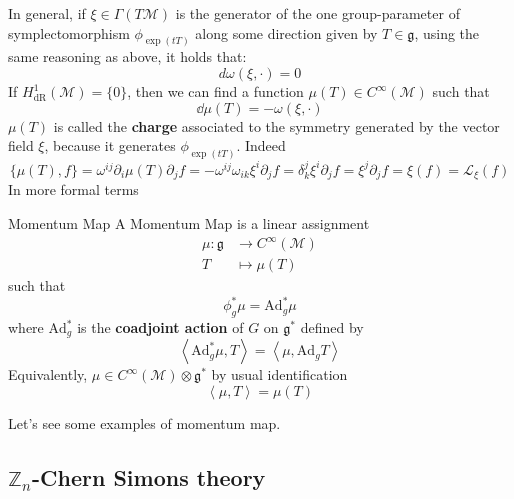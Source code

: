 \documentclass[11pt]{article}
\theoremstyle{definition}
\numberwithin{equation}{section}
\begin{document}
In general, if $\xi \in \Gamma(T \mathcal{M})$ is the generator of the one group-parameter of symplectomorphism $\phi_{\exp(t T)}$ along some direction given by $T \in \mathfrak{g}$, using the same reasoning as above, it holds that:
\begin{equation}
    d \omega(\xi, \cdot) =0
\end{equation}
If $H^1_{\text{dR}}(\mathcal{M})= \{0\}$, then we can find a function $\mu(T) \in C^{\infty}(\mathcal{M})$ such that
\begin{equation*}
    \dd \mu(T) = - \omega(\xi, \cdot)
\end{equation*}
$\mu(T)$ is called the \textbf{charge} associated to the symmetry generated by the vector field $\xi$, because it generates $\phi_{\exp(t T)}$. Indeed
\begin{equation}
    \{ \mu(T), f\} = \omega^{ij} \partial_i \mu(T)\partial_j f = - \omega^{ij} \omega_{ik} \xi^i \partial_j f = \delta^j_k \xi^i \partial_j f = \xi^j \partial_j f = \xi(f) = \mathcal{L}_{\xi}(f)
\end{equation}
In more formal terms
\begin{defn}{Momentum Map}{}
   A Momentum Map is a linear assignment
  \begin{equation}
  \begin{aligned}
  	 \mu:  \mathfrak{g} &\to C^{\infty}(\mathcal{M})\\
	T &\mapsto \mu(T)
    \end{aligned}
\end{equation}
such that
\begin{equation}
     \phi_g^* \mu = \text{Ad}^*_g \mu
\end{equation}
where $\text{Ad}^*_g$ is the \textbf{coadjoint action} of $G$ on $\mathfrak{g}^*$ defined by
\begin{equation}
    \left \langle \text{Ad}^*_g \mu , T \right \rangle = \left \langle \mu , \text{Ad}_g T \right \rangle
\end{equation}
Equivalently, $\mu \in  C^{\infty}(\mathcal{M}) \otimes \mathfrak{g}^*$ by usual identification
\begin{equation}
    \left \langle \mu, T \right \rangle = \mu(T)
\end{equation}
\end{defn} 
Let's see some examples of momentum map.

\subsection{\texorpdfstring{$\mathbb{Z}_n$-Chern Simons theory}{ZnCS}}\label{ZNCS}
\end{document}

